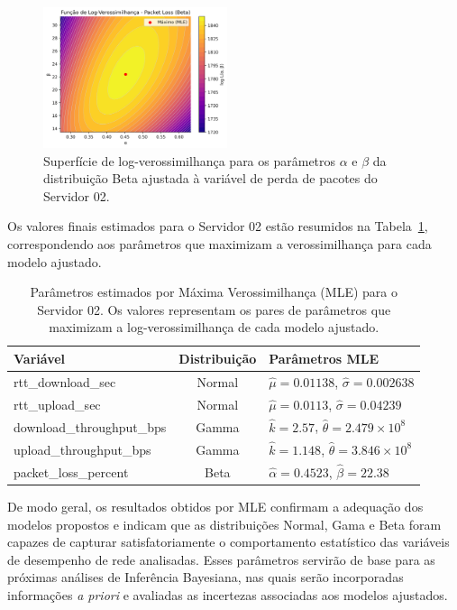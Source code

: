 \documentclass{article}
\begin{document}
\begin{figure}[htp]
	\centering
	\includegraphics[width=0.48\textwidth]{../figures/mle/packet_loss_loglik_surface_beta_server02.png}
	\caption{Superfície de log-verossimilhança para os parâmetros $\alpha$ e $\beta$ da distribuição Beta ajustada à variável de perda de pacotes do Servidor 02.}
	\label{fig:packet_loss_loglik_surface_beta_server02}
\end{figure}

Os valores finais estimados para o Servidor 02 estão resumidos na
Tabela~\ref{tab:mle_parameters_server02},
correspondendo aos parâmetros que maximizam a verossimilhança para cada modelo ajustado.

\begin{table}[h!]
	\centering
	\caption{Parâmetros estimados por Máxima Verossimilhança (MLE) para o Servidor 02. Os valores representam os pares de parâmetros que maximizam a log-verossimilhança de cada modelo ajustado.}
	\label{tab:mle_parameters_server02}
	\begin{tabular}{|l|c|l|}
		\hline
		\textbf{Variável} & \textbf{Distribuição} & \textbf{Parâmetros MLE} \\
		\hline
		rtt\_download\_sec & Normal & $\hat{\mu}=0.01138$, $\hat{\sigma}=0.002638$ \\
		\hline
		rtt\_upload\_sec & Normal & $\hat{\mu}=0.0113$, $\hat{\sigma}=0.04239$ \\
		\hline
		download\_throughput\_bps & Gamma & $\hat{k}=2.57$, $\hat{\theta}=2.479 \times 10^8$ \\
		\hline
		upload\_throughput\_bps & Gamma & $\hat{k}=1.148$, $\hat{\theta}=3.846 \times 10^8$ \\
		\hline
		packet\_loss\_percent & Beta & $\hat{\alpha}=0.4523$, $\hat{\beta}=22.38$ \\
		\hline
	\end{tabular}
\end{table}

De modo geral, os resultados obtidos por MLE confirmam a adequação dos modelos propostos
e indicam que as distribuições Normal, Gama e Beta foram capazes de capturar satisfatoriamente
o comportamento estatístico das variáveis de desempenho de rede analisadas.
Esses parâmetros servirão de base para as próximas análises de Inferência Bayesiana,
nas quais serão incorporadas informações \textit{a priori} e avaliadas as incertezas associadas
aos modelos ajustados.
\end{document}
